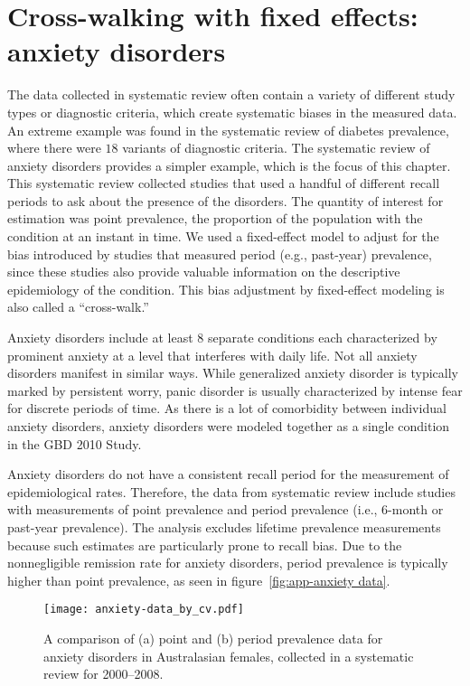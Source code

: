 \chapter{Cross-walking with fixed effects: anxiety disorders}
\label{applications-efx_study_level}

The data collected in systematic review often contain a variety of
different study types or diagnostic criteria, which create systematic
biases in the measured data.  An extreme example was found in the
systematic review of diabetes prevalence, where there were $18$ variants
of diagnostic criteria.  The systematic review of anxiety disorders
provides a simpler example, which is the focus of this chapter. This
systematic review collected studies that used a handful of different
recall periods to ask about the presence of the disorders. The quantity
of interest for estimation was point prevalence, the
proportion of the population with the condition at an instant in time.
We used a fixed-effect model to adjust for the bias introduced by
studies that measured period (e.g., past-year) prevalence, since these studies also provide
valuable information on the descriptive epidemiology of the condition.
This bias adjustment by fixed-effect modeling is also called a
``cross-walk.''

Anxiety disorders include at least $8$ separate conditions each
characterized by prominent anxiety at a level that interferes with
daily life.  Not all anxiety disorders manifest in similar ways.
While generalized anxiety disorder is typically marked by persistent
worry, panic disorder is usually characterized by intense fear for
discrete periods of time. \cite{american_psychiatric_association_diagnostic_2000} As there is
a lot of comorbidity between individual anxiety disorders, anxiety
disorders were modeled together as a single condition in the GBD 2010
Study.

Anxiety disorders do not have a consistent recall period for the
measurement of epidemiological rates.  Therefore, the data from
systematic review include studies with measurements of point prevalence
and period prevalence (i.e., $6$-month or past-year prevalence).  The
analysis excludes lifetime prevalence measurements because such estimates
are particularly prone to recall bias.  Due to the nonnegligible
remission rate for anxiety disorders, period prevalence is typically
higher than point prevalence, as seen in figure~\ref{fig:app-anxiety
  data}.

    \begin{figure}[h]
        \begin{center}
            \texttt{[image: anxiety-data\_by\_cv.pdf]}
            \caption{A comparison of (a) point and (b) period prevalence data
              for anxiety disorders in Australasian females, collected in a systematic review for
              2000--2008.}
            \label{fig:app-anxiety data}
        \end{center}
    \end{figure}

